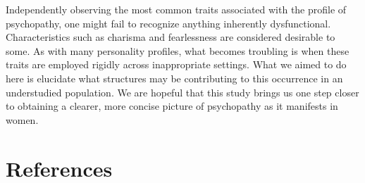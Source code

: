 \documentclass[
  man,floatsintext]{apa7}
\begin{document}
Independently observing the most common traits associated with the profile of psychopathy, one might fail to recognize anything inherently dysfunctional. Characteristics such as charisma and fearlessness are considered desirable to some. As with many personality profiles, what becomes troubling is when these traits are employed rigidly across inappropriate settings. What we aimed to do here is elucidate what structures may be contributing to this occurrence in an understudied population. We are hopeful that this study brings us one step closer to obtaining a clearer, more concise picture of psychopathy as it manifests in women.

\newpage

\hypertarget{references}{%
\section{References}\label{references}}
\end{document}
